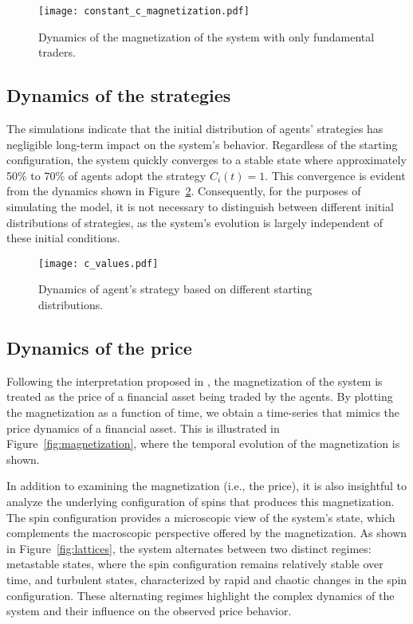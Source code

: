 \begin{figure}[H]
    \centering
    \texttt{[image: constant\_c\_magnetization.pdf]}
    \caption{Dynamics of the magnetization of the system with only fundamental traders.}
    \label{fig:fundamental_traders}
\end{figure}

\subsection{Dynamics of the strategies}
The simulations indicate that the initial distribution of agents' strategies has negligible long-term impact on the system's behavior. Regardless of the starting configuration, the system quickly converges to a stable state where approximately 50\% to 70\% of agents adopt the strategy $C_i(t) = 1$. This convergence is evident from the dynamics shown in Figure~\ref{fig:strategies}. Consequently, for the purposes of simulating the model, it is not necessary to distinguish between different initial distributions of strategies, as the system's evolution is largely independent of these initial conditions.

\begin{figure}[H]
    \centering
    \texttt{[image: c\_values.pdf]}
    \caption{Dynamics of agent's strategy based on different starting distributions.}
    \label{fig:strategies}
\end{figure}

\subsection{Dynamics of the price}
Following the interpretation proposed in \cite{bornholdt}, the magnetization of the system is treated as the price of a financial asset being traded by the agents. By plotting the magnetization as a function of time, we obtain a time-series that mimics the price dynamics of a financial asset. This is illustrated in Figure~\ref{fig:magnetization}, where the temporal evolution of the magnetization is shown.

In addition to examining the magnetization (i.e., the price), it is also insightful to analyze the underlying configuration of spins that produces this magnetization. The spin configuration provides a microscopic view of the system's state, which complements the macroscopic perspective offered by the magnetization. As shown in Figure~\ref{fig:lattices}, the system alternates between two distinct regimes: metastable states, where the spin configuration remains relatively stable over time, and turbulent states, characterized by rapid and chaotic changes in the spin configuration. These alternating regimes highlight the complex dynamics of the system and their influence on the observed price behavior.

